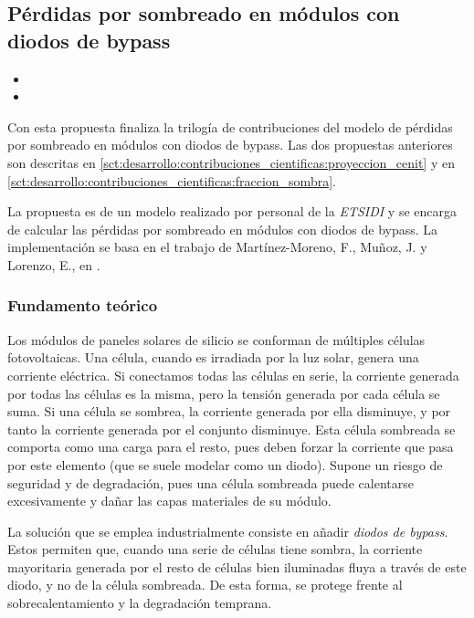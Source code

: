 \subsection{Pérdidas por sombreado en módulos con diodos de bypass} \label{sct:desarrollo:contribuciones_cientificas:perdidas_sombreado}

\begin{itemize}
    \item {}
    \item {}
\end{itemize}

Con esta propuesta finaliza la trilogía de contribuciones del modelo de pérdidas por sombreado en módulos con diodos de bypass. Las dos propuestas anteriores son descritas en \ref{sct:desarrollo:contribuciones_cientificas:proyeccion_cenit} y en \ref{sct:desarrollo:contribuciones_cientificas:fraccion_sombra}.

La propuesta es de un modelo realizado por personal de la \textit{ETSIDI} y se encarga de calcular las pérdidas por sombreado en módulos con diodos de bypass. La implementación se basa en el trabajo de Martínez-Moreno, F., Muñoz, J. y Lorenzo, E., en \cite{Martínez-Moreno_Muñoz_Lorenzo_2010}.

\subsubsection{Fundamento teórico}

Los módulos de paneles solares de silicio se conforman de múltiples células fotovoltaicas. Una célula, cuando es irradiada por la luz solar, genera una corriente eléctrica. Si conectamos todas las células en serie, la corriente generada por todas las células es la misma, pero la tensión generada por cada célula se suma. Si una célula se sombrea, la corriente generada por ella disminuye, y por tanto la corriente generada por el conjunto disminuye. Esta célula sombreada se comporta como una carga para el resto, pues deben forzar la corriente que pasa por este elemento (que se suele modelar como un diodo). Supone un riesgo de seguridad y de degradación, pues una célula sombreada puede calentarse excesivamente y dañar las capas materiales de su módulo.

La solución que se emplea industrialmente consiste en añadir \textit{diodos de bypass}. Estos permiten que, cuando una serie de células tiene sombra, la corriente mayoritaria generada por el resto de células bien iluminadas fluya a través de este diodo, y no de la célula sombreada. De esta forma, se protege frente al sobrecalentamiento y la degradación temprana.

